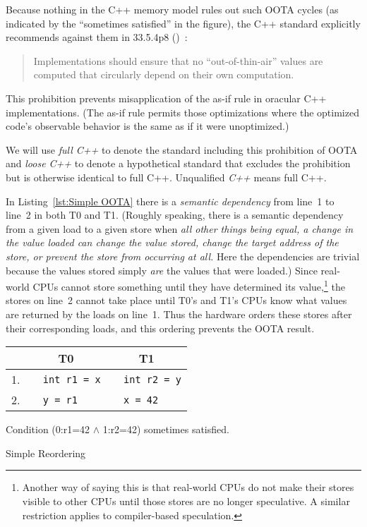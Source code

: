 Because nothing in the C++ memory model rules out such OOTA cycles
(as indicated by the ``sometimes satisfied'' in the figure), the C++
standard explicitly recommends against them in 33.5.4p8
()~\cite{ThomasKoeppe2023N4950}:
\begin{quote}
	Implementations should ensure that no ``out-of-thin-air'' values
	are computed that circularly depend on their own computation.
\end{quote}
This prohibition prevents misapplication of the as-if rule in oracular
C++ implementations.
(The as-if rule permits those optimizations where the optimized code's
observable behavior is the same as if it were unoptimized.)

We will use \emph{full C++} to denote the standard including this
prohibition of OOTA and \emph{loose C++} to denote a hypothetical standard
that excludes the prohibition but is otherwise identical to full C++.
Unqualified \emph{C++} means full C++.

In Listing~\ref{lst:Simple OOTA}
there is a \emph{semantic dependency} from line~1 to line~2 in both
T0 and T1.
(Roughly speaking, there is a semantic dependency from a given load to
a given store when \emph{all other things being equal, a change in the
value loaded can change the value stored, change the target address of
the store, or prevent the store from occurring at all.}
Here the dependencies are trivial because the values stored simply
\emph{are} the values that were loaded.)
Since real-world CPUs cannot store something
until they have determined its value,\footnote{
	Another way of saying this is that real-world CPUs do not
	make their stores visible to other CPUs until those stores
	are no longer speculative.
	A similar restriction applies to compiler-based speculation.}
the stores on line~2 cannot take place until T0's and T1's CPUs
know what values are returned by the loads on line~1.
Thus the hardware orders these stores after their corresponding loads,
and this ordering prevents the OOTA result.

\begin{listing}[bp]
{
\small
\begin{tabular}{r|l|l}
& \multicolumn{1}{c}{T0} & \multicolumn{1}{c}{T1} \\
\hline
1. &
\texttt{~~int r1 = x} &
	\texttt{~~int r2 = y} \\
2. &
\texttt{~~y = r1} &
	\texttt{~~x = 42} \\
\end{tabular}

\vspace{0.1in}
Condition (0:r1=42 $\wedge$ 1:r2=42)
sometimes satisfied.
}
\caption{Simple Reordering}
\label{lst:Simple Reordering}
\end{listing}

